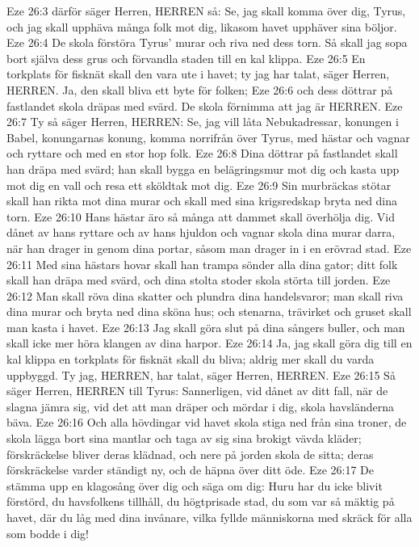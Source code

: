 Eze 26:3  därför säger Herren, HERREN så: Se, jag skall komma över dig, Tyrus, och jag skall upphäva många folk mot dig, likasom havet upphäver sina böljor.
Eze 26:4  De skola förstöra Tyrus' murar och riva ned dess torn. Så skall jag sopa bort själva dess grus och förvandla staden till en kal klippa.
Eze 26:5  En torkplats för fisknät skall den vara ute i havet; ty jag har talat, säger Herren, HERREN. Ja, den skall bliva ett byte för folken;
Eze 26:6  och dess döttrar på fastlandet skola dräpas med svärd. De skola förnimma att jag är HERREN.
Eze 26:7  Ty så säger Herren, HERREN: Se, jag vill låta Nebukadressar, konungen i Babel, konungarnas konung, komma norrifrån över Tyrus, med hästar och vagnar och ryttare och med en stor hop folk.
Eze 26:8  Dina döttrar på fastlandet skall han dräpa med svärd; han skall bygga en belägringsmur mot dig och kasta upp mot dig en vall och resa ett sköldtak mot dig.
Eze 26:9  Sin murbräckas stötar skall han rikta mot dina murar och skall med sina krigsredskap bryta ned dina torn.
Eze 26:10  Hans hästar äro så många att dammet skall överhölja dig. Vid dånet av hans ryttare och av hans hjuldon och vagnar skola dina murar darra, när han drager in genom dina portar, såsom man drager in i en erövrad stad.
Eze 26:11  Med sina hästars hovar skall han trampa sönder alla dina gator; ditt folk skall han dräpa med svärd, och dina stolta stoder skola störta till jorden.
Eze 26:12  Man skall röva dina skatter och plundra dina handelsvaror; man skall riva dina murar och bryta ned dina sköna hus; och stenarna, trävirket och gruset skall man kasta i havet.
Eze 26:13  Jag skall göra slut på dina sångers buller, och man skall icke mer höra klangen av dina harpor.
Eze 26:14  Ja, jag skall göra dig till en kal klippa en torkplats för fisknät skall du bliva; aldrig mer skall du varda uppbyggd. Ty jag, HERREN, har talat, säger Herren, HERREN.
Eze 26:15  Så säger Herren, HERREN till Tyrus: Sannerligen, vid dånet av ditt fall, när de slagna jämra sig, vid det att man dräper och mördar i dig, skola havsländerna bäva.
Eze 26:16  Och alla hövdingar vid havet skola stiga ned från sina troner, de skola lägga bort sina mantlar och taga av sig sina brokigt vävda kläder; förskräckelse bliver deras klädnad, och nere på jorden skola de sitta; deras förskräckelse varder ständigt ny, och de häpna över ditt öde.
Eze 26:17  De stämma upp en klagosång över dig och säga om dig: Huru har du icke blivit förstörd, du havsfolkens tillhåll, du högtprisade stad, du som var så mäktig på havet, där du låg med dina invånare, vilka fyllde människorna med skräck för alla som bodde i dig!
